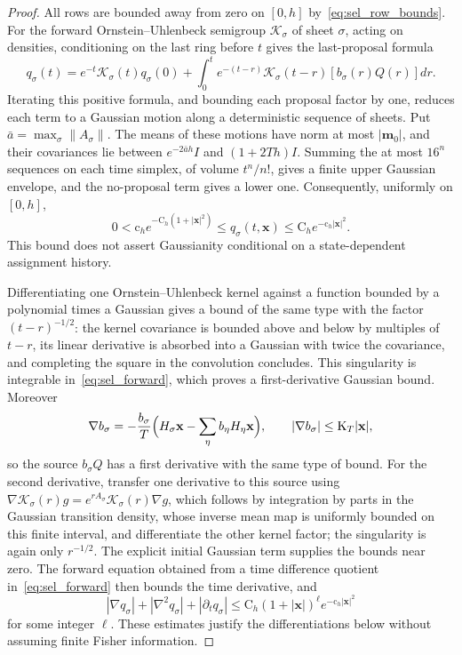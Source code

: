 \begin{proof}
All rows are bounded away from zero on $[0,h]$ by~\eqref{eq:sel_row_bounds}. For the forward Ornstein--Uhlenbeck semigroup $\mathcal K_\sigma$ of sheet $\sigma$, acting on densities, conditioning on the last ring before $t$ gives the last-proposal formula
\begin{equation}
q_\sigma(t)=e^{-t}\mathcal K_\sigma(t)q_\sigma(0)+\int_0^te^{-(t-r)}\mathcal K_\sigma(t-r)[b_\sigma(r)Q(r)]dr.
\label{eq:sel_forward}
\end{equation}
Iterating this positive formula, and bounding each proposal factor by one, reduces each term to a Gaussian motion along a deterministic sequence of sheets. Put $\bar a=\max_\sigma\|A_\sigma\|$. The means of these motions have norm at most $|\mathbf m_0|$, and their covariances lie between $e^{-2\bar ah}I$ and $(1+2Th)I$. Summing the at most $16^n$ sequences on each time simplex, of volume $t^n/n!$, gives a finite upper Gaussian envelope, and the no-proposal term gives a lower one. Consequently, uniformly on $[0,h]$,
\begin{equation}
0<\mathrm c_he^{-\mathrm C_h(1+|\mathbf x|^2)}\le q_\sigma(t,\mathbf x)\le\mathrm C_he^{-\mathrm c_h|\mathbf x|^2}.
\label{eq:sel_density_envelopes}
\end{equation}
This bound does not assert Gaussianity conditional on a state-dependent assignment history.

Differentiating one Ornstein--Uhlenbeck kernel against a function bounded by a polynomial times a Gaussian gives a bound of the same type with the factor $(t-r)^{-1/2}$: the kernel covariance is bounded above and below by multiples of $t-r$, its linear derivative is absorbed into a Gaussian with twice the covariance, and completing the square in the convolution concludes. This singularity is integrable in~\eqref{eq:sel_forward}, which proves a first-derivative Gaussian bound. Moreover
\[
\nabla b_\sigma=-\frac{b_\sigma}T\Bigl(H_\sigma\mathbf x-\sum_\eta b_\eta H_\eta\mathbf x\Bigr),\qquad|\nabla b_\sigma|\le\mathrm K_T|\mathbf x|,
\]
so the source $b_\sigma Q$ has a first derivative with the same type of bound. For the second derivative, transfer one derivative to this source using $\nabla\mathcal K_\sigma(r)g=e^{rA_\sigma}\mathcal K_\sigma(r)\nabla g$, which follows by integration by parts in the Gaussian transition density, whose inverse mean map is uniformly bounded on this finite interval, and differentiate the other kernel factor; the singularity is again only $r^{-1/2}$. The explicit initial Gaussian term supplies the bounds near zero. The forward equation obtained from a time difference quotient in~\eqref{eq:sel_forward} then bounds the time derivative, and
\begin{equation}
|\nabla q_\sigma|+|\nabla^2q_\sigma|+|\partial_tq_\sigma|\le\mathrm C_h(1+|\mathbf x|)^\ell e^{-\mathrm c_h|\mathbf x|^2}
\label{eq:sel_density_derivatives}
\end{equation}
for some integer $\ell$. These estimates justify the differentiations below without assuming finite Fisher information.


\end{proof}
